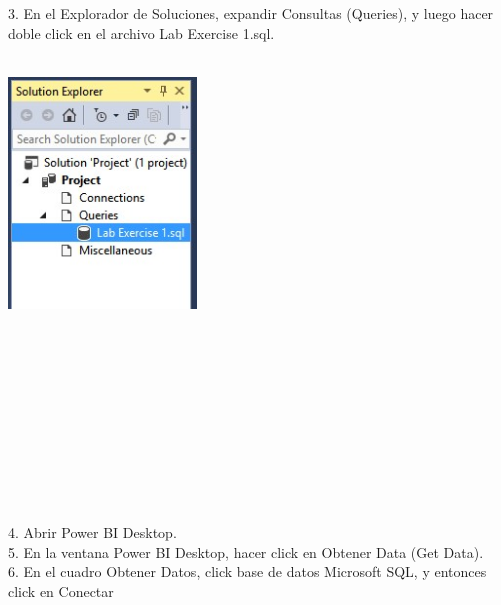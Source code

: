\documentclass[12pt,letterpaper]{article}
\begin{document}
\begin{flushleft}
\begin{itemize}
3. En el Explorador de Soluciones, expandir Consultas (Queries), y luego hacer doble click en el archivo Lab
Exercise 1.sql.\\
\textbf{ }\\
\begin{center}
	\includegraphics[width=5cm]{./Imagenes/image2} 
	\end{center}
\textbf{ }\\
\textbf{ }\\
\textbf{ }\\
\textbf{ }\\
\textbf{ }\\
\textbf{ }\\
\textbf{ }\\
\textbf{ }\\
\textbf{ }\\
\textbf{ }\\
4. Abrir Power BI Desktop.\\
5. En la ventana Power BI Desktop, hacer click en Obtener Data (Get Data).\\
6. En el cuadro Obtener Datos, click base de datos Microsoft SQL, y entonces click en Conectar\\


\end{itemize}
\end{flushleft}
\end{document}
